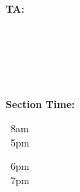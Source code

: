 \begin{center}
  \textbf{TA:}\ 
  \parbox[t]{0.95in}{%
    \checkbox\ \TAOne
  }
  \parbox[t]{0.95in}{%
    \checkbox\ \TATwo\\
  }
  \parbox[t]{0.95in}{%
    \checkbox\ \TAThree
  }
  \hspace*{0.5in} 
  \parbox[t]{3in}{%
    \textbf{Section Time:}
    \parbox[t]{0.75in}{%
      \checkbox\ 8am \\
      \checkbox\ 5pm
    }
    \parbox[t]{0.75in}{%
      \checkbox\ 6pm \\
      \checkbox\ 7pm
    }
  }
\end{center}
